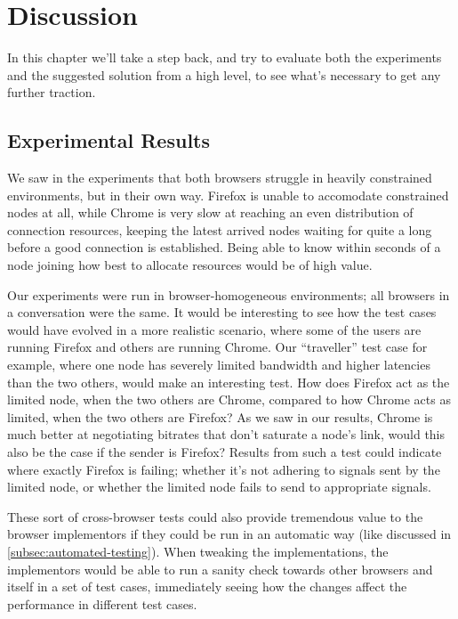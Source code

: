\chapter{Discussion}
\label{chp:discussion}

In this chapter we'll take a step back, and try to evaluate both the experiments and the suggested solution from a high level, to see what's necessary to get any further traction.

\section{Experimental Results}

We saw in the experiments that both browsers struggle in heavily constrained environments, but in their own way. Firefox is unable to accomodate constrained nodes at all, while Chrome is very slow at reaching an even distribution of connection resources, keeping the latest arrived nodes waiting for quite a long before a good connection is established. Being able to know within seconds of a node joining how best to allocate resources would be of high value.

Our experiments were run in browser-homogeneous environments; all browsers in a conversation were the same. It would be interesting to see how the test cases would have evolved in a more realistic scenario, where some of the users are running Firefox and others are running Chrome. Our ``traveller'' test case for example, where one node has severely limited bandwidth and higher latencies than the two others, would make an interesting test. How does Firefox act as the limited node, when the two others are Chrome, compared to how Chrome acts as limited, when the two others are Firefox? As we saw in our results, Chrome is much better at negotiating bitrates that don't saturate a node's link, would this also be the case if the sender is Firefox? Results from such a test could indicate where exactly Firefox is failing; whether it's not adhering to signals sent by the limited node, or whether the limited node fails to send to appropriate signals.

These sort of cross-browser tests could also provide tremendous value to the browser implementors if they could be run in an automatic way (like discussed in \autoref{subsec:automated-testing}). When tweaking the implementations, the implementors would be able to run a sanity check towards other browsers and itself in a set of test cases, immediately seeing how the changes affect the performance in different test cases.


